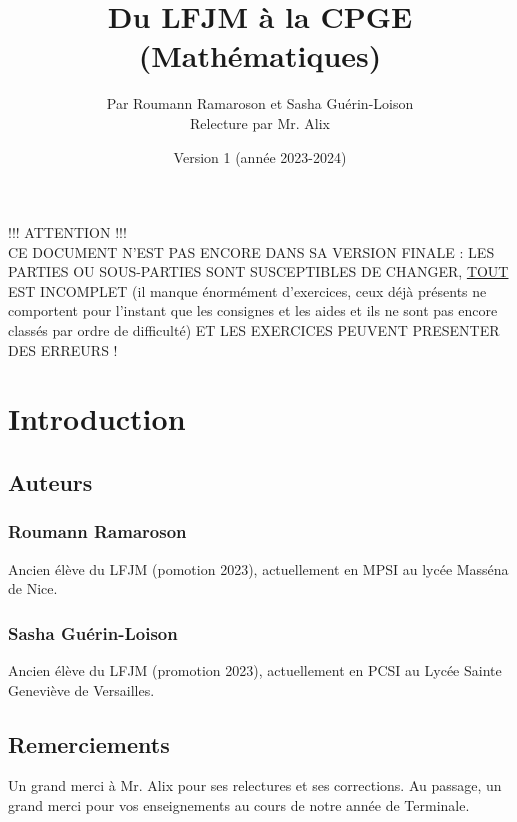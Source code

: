 \documentclass[a4paper]{report}
\title{Du LFJM à la CPGE (Mathématiques)}
\author{Par Roumann Ramaroson et Sasha Guérin-Loison\\Relecture par Mr. Alix}
\date{Version 1 (année 2023-2024)}
\begin{document}
\hspace{0pt}
\vfill
\begin{center}
	!!! ATTENTION !!!\\
	CE DOCUMENT N'EST PAS ENCORE DANS SA VERSION FINALE : LES PARTIES OU SOUS-PARTIES SONT SUSCEPTIBLES DE CHANGER, \underline{TOUT} EST INCOMPLET (il manque énormément d'exercices, ceux déjà présents ne comportent pour l'instant que les consignes et les aides et ils ne sont pas encore classés par ordre de difficulté) ET LES EXERCICES PEUVENT PRESENTER DES ERREURS !
\end{center}
\vfill
\hspace{0pt}

\maketitle
\tableofcontents

\chapter{Introduction}
	\section{Auteurs}

		\subsection{Roumann Ramaroson}
			Ancien élève du LFJM (pomotion 2023), actuellement en MPSI au lycée Masséna de Nice.
			
		\subsection{Sasha Guérin-Loison}
			Ancien élève du LFJM (promotion 2023), actuellement en PCSI au Lycée Sainte Geneviève de Versailles.
			
	\section{Remerciements}
		Un grand merci à Mr. Alix pour ses relectures et ses corrections. Au passage, un grand merci pour vos enseignements au cours de notre année de Terminale.
		
\end{document}
